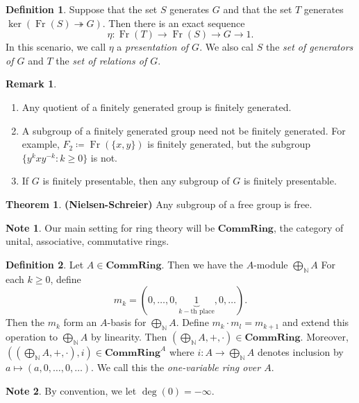 \documentclass[10pt,letterpaper,cm]{nupset}
\theoremstyle{definition}
\newtheorem*{definition}{Definition}
\newtheorem{note}{Note}
\newtheorem{remark}{Remark}
\newtheorem{theorem}{Theorem}
\newcommand{\N}{\mathbb N}
\newcommand{\1}{\mathbf{1}}
\newcommand{\0}{\vec 0}
\DeclareMathOperator{\Fr}{Fr}
\begin{document}
\begin{definition}
Suppose that the set $S$ generates $G$ and that the set $T$ generates $\ker(\Fr(S) \twoheadrightarrow G)$. Then there is an exact sequence $$\eta :  \Fr(T) \to \Fr(S) \to G \to 1.$$ In this scenario, we call $\eta$ a \textit{presentation of $G$}. We also cal $S$ the \textit{set of generators of $G$} and $T$ the \textit{set of relations of $G$}.
\end{definition}

\begin{remark} $ $
\begin{enumerate}
\item Any quotient of a finitely generated group is finitely generated.
\item A subgroup of a finitely generated group need not be finitely generated. For example, $F_2\coloneqq \Fr(\{x,y\})$ is finitely generated, but the subgroup $\{y^kxy^{-k} : k \geq 0\}$ is not.
\item If $G$ is finitely presentable, then any subgroup of $G$ is finitely presentable.
\end{enumerate}  
\end{remark}

\begin{theorem}{\textbf{(Nielsen-Schreier)}}
Any subgroup of a free group is free.
\end{theorem}

\begin{note}
Our main setting for ring theory will be $\mathbf{CommRing}$, the category of unital, associative, commutative rings.
\end{note}

\begin{definition}
Let $A \in \mathbf{CommRing}$. Then we have the $A$-module $\bigoplus_{\N} A$ For each $k\geq 0$, define $$m_k = (0, \ldots, 0, \underbrace{1}_{k-\text{th place}}, 0 , \ldots).$$ Then the $m_k$ form an $A$-basis for  $\bigoplus_{\N} A$. Define $m_k \cdot m_l = m_{k+1}$ and extend this operation to $\bigoplus_{\N} A$ by linearity. Then $(\bigoplus_{\N} A, + , \cdot) \in  \mathbf{CommRing}$. Moreover, $((\bigoplus_{\N} A, + , \cdot), i) \in  \mathbf{CommRing}^A$ where $i : A \to \bigoplus_{\N}A$ denotes inclusion by $a \mapsto (a, 0, \ldots, 0, \ldots)$. We call this the \textit{one-variable ring over $A$}.
\end{definition}

\begin{note}
By convention, we let $\deg(0)= {-}\infty$.
\end{note}
\end{document}
